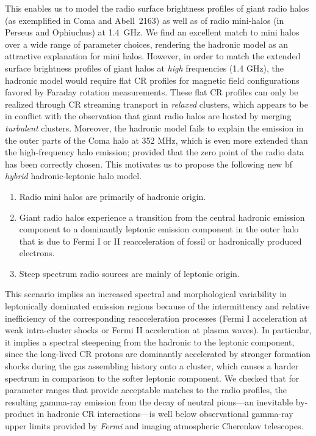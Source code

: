 \documentclass[useAMS,usenatbib]{mn2e}
\begin{document}
This enables us to model the radio surface brightness profiles of giant radio
halos (as exemplified in Coma and Abell~2163) as well as of radio mini-halos (in
Perseus and Ophiuchus) at 1.4~GHz. We find an excellent match to mini halos over
a wide range of parameter choices, rendering the hadronic model as an attractive
explanation for mini halos. However, in order to match the extended surface
brightness profiles of giant halos at {\em high} frequencies (1.4 GHz), the
hadronic model would require flat CR profiles for magnetic field configurations
favored by Faraday rotation measurements.  These flat CR profiles can only be
realized through CR streaming transport in {\em relaxed} clusters, which appears
to be in conflict with the observation that giant radio halos are hosted by merging
{\em turbulent} clusters. Moreover, the hadronic model fails to explain the
emission in the outer parts of the Coma halo at 352 MHz, which is even more
extended than the high-frequency halo emission; provided that the zero point of
the radio data has been correctly chosen. This motivates us to propose the
following new {bf \emph{hybrid}} hadronic-leptonic halo model.
\begin{enumerate}
\item Radio mini halos are primarily of hadronic origin.  
\item Giant radio halos experience a transition from the central hadronic
  emission component to a dominantly leptonic emission component in the outer
  halo that is due to Fermi I or II reacceleration of fossil or hadronically
  produced electrons.
\item Steep spectrum radio sources are mainly of leptonic origin.
\end{enumerate}
This scenario implies an increased spectral and morphological variability in
leptonically dominated emission regions because of the intermittency and
relative inefficiency of the corresponding reacceleration processes (Fermi I
acceleration at weak intra-cluster shocks or Fermi II acceleration at plasma
waves). In particular, it implies a spectral steepening from the hadronic to the
leptonic component, since the long-lived CR protons are dominantly accelerated
by stronger formation shocks during the gas assembling history onto a cluster,
which causes a harder spectrum in comparison to the softer leptonic component.
We checked that for parameter ranges that provide acceptable matches to the
radio profiles, the resulting gamma-ray emission from the decay of neutral
pions---an inevitable by-product in hadronic CR interactions---is well below
observational gamma-ray upper limits provided by {\em Fermi} and imaging
atmospheric Cherenkov telescopes.
\end{document}
